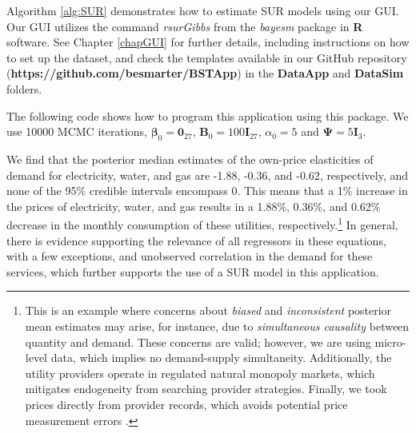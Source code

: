 Algorithm \ref{alg:SUR} demonstrates how to estimate SUR models using our GUI. Our GUI utilizes the command \textit{rsurGibbs} from the \textit{bayesm} package in \textbf{R} software. See Chapter \ref{chapGUI} for further details, including instructions on how to set up the dataset, and check the templates available in our GitHub repository (\textbf{https://github.com/besmarter/BSTApp}) in the \textbf{DataApp} and \textbf{DataSim} folders.

The following code shows how to program this application using this package. We use 10000 MCMC iterations, $\bm{\beta}_0=\bm{0}_{27}$, $\bm{B}_0=100\bm{I}_{27}$, $\alpha_0=5$ and $\bm{\Psi}=5\bm{I}_3$.

We find that the posterior median estimates of the own-price elasticities of demand for electricity, water, and gas are -1.88, -0.36, and -0.62, respectively, and none of the 95\% credible intervals encompass 0. This means that a 1\% increase in the prices of electricity, water, and gas results in a 1.88\%, 0.36\%, and 0.62\% decrease in the monthly consumption of these utilities, respectively.\footnote{This is an example where concerns about \textit{biased} and \textit{inconsistent} posterior mean estimates may arise, for instance, due to \textit{simultaneous causality} between quantity and demand. These concerns are valid; however, we are using micro-level data, which implies no demand-supply simultaneity. Additionally, the utility providers operate in regulated natural monopoly markets, which mitigates endogeneity from searching provider strategies. Finally, we took prices directly from provider records, which avoids potential price measurement errors \cite{ramirez2024welfare}.} In general, there is evidence supporting the relevance of all regressors in these equations, with a few exceptions, and unobserved correlation in the demand for these services, which further supports the use of a SUR model in this application.

